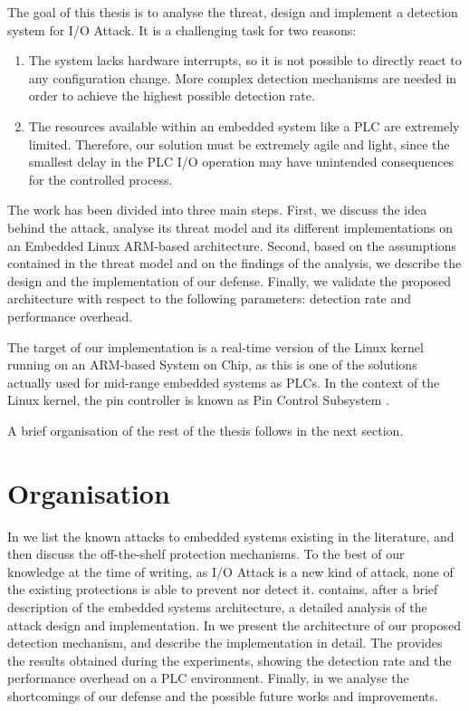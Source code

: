 The goal of this thesis is to analyse the threat, design and implement a detection system for I/O Attack.
It is a challenging task for two reasons:
\begin{enumerate}
	\item The system lacks hardware interrupts, so it is not possible to directly react to any configuration change. More complex detection mechanisms are needed
		in order to achieve the highest possible detection rate.
	\item The resources available within an embedded system like a PLC are extremely limited. Therefore, our solution must be extremely agile and light,
		since the smallest delay in the PLC I/O operation may have unintended consequences for the controlled process.
\end{enumerate}

The work has been divided into three main steps.
First, we discuss the idea behind the attack, analyse its threat model and its different implementations on an Embedded Linux ARM-based architecture.
Second, based on the assumptions contained in the threat model and on the findings of the analysis, we describe the design and the implementation of our defense.
Finally, we validate the proposed architecture with respect to the following parameters: detection rate and performance overhead.

The target of our implementation is a real-time version of the Linux kernel running on an ARM-based System on Chip,
as this is one of the solutions actually used for mid-range embedded systems as PLCs.
In the context of the Linux kernel, the pin controller is known as Pin Control Subsystem \cite{pinctrl}.

A brief organisation of the rest of the thesis follows in the next section.


\section{Organisation}

In  we list the known attacks to embedded systems existing in the literature, and then discuss the off-the-shelf protection mechanisms.
To the best of our knowledge at the time of writing, as I/O Attack is a new kind of attack, none of the existing protections is able to prevent nor detect it.
 contains, after a brief description of the embedded systems architecture, a detailed analysis of the attack design and implementation.
In  we present the architecture of our proposed detection mechanism, and describe the implementation in detail.
The  provides the results obtained during the experiments, showing the detection rate and the performance overhead on a PLC environment.
Finally, in  we analyse the shortcomings of our defense and the possible future works and improvements.
